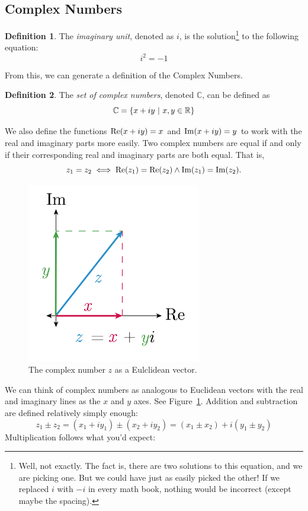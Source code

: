 \documentclass[10pt]{scrartcl}
\numberwithin{equation}{subsection}
\theoremstyle{definition}
\newtheorem{definition}{Definition}[section]
\theoremstyle{remark}
\newenvironment{definitionSR}
	{
		\begin{siderules}
			\begin{definition}
			}
			{
			\end{definition}
		\end{siderules}
	}
\newcommand{\Reals}{\mathbb{R}}
\newcommand{\Complex}{\mathbb{C}}
\newcommand{\ReP}[1]{
		\mathrm{Re}\pqty{#1}
	}
\newcommand{\ImP}[1]{
		\mathrm{Im}\pqty{#1}
	}
\begin{document}
\subsection{Complex Numbers}
\label{ComplexNumbers}
\begin{definitionSR}
	The \emph{imaginary unit}, denoted as $i$, is the
	solution\footnote{Well, not exactly. The fact is, there are two
		solutions to this equation, and we are picking one. But we could have
		just as easily picked the other! If we replaced $i$ with $-i$ in every math
	book, nothing would be incorrect (except maybe the spacing).} to the following
	equation:
	\[
		i^2 = -1
	\]
\end{definitionSR}
From this, we can generate a definition of the Complex Numbers.
\begin{definitionSR}
	The \emph{set of complex numbers}, denoted $\Complex$, can be defined as
	\[
		\Complex = \Bqty{x+iy ~ | ~ x,y \in \Reals}
	\]
\end{definitionSR}
We also define the functions $\ReP{x+iy}=x$ and $\ImP{x+iy}=y$ to work with the
real and imaginary parts more easily.
Two complex numbers are equal if and only if their corresponding real and
imaginary parts are both equal. That is,
\[
	z_1 = z_2 \iff \ReP{z_1} = \ReP{z_2} \wedge \ImP{z_1} = \ImP{z_2}.
\]
\begin{figure}[h]
	\centering
	\caption{The complex number $z$ as a Eulclidean vector.}
	\label{fig:complexAddition}
	\includegraphics[width=3in]{complex_number_diagram-01}
\end{figure}
We can think of complex numbers as analogous to Euclidean vectors with
the real and imaginary lines as the $x$ and $y$ axes. See Figure~\ref{fig:complexAddition}. 
Addition and subtraction are defined relatively simply enough:
\[
	z_1 \pm z_2 = (x_1 + i y_1) \pm (x_2 + i y_2) = (x_1 \pm x_2) + i (y_1 \pm y_2)
\]
Multiplication follows what you'd expect:
\end{document}
